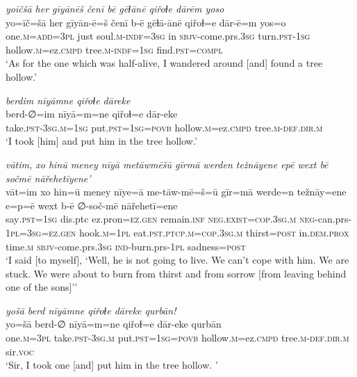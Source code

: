 \ea \label{ZQ.23}
\textit{yoīčšā her gīyānēš čenī bē gēɫānē qiřoɫe dārēm yoso} \\ 
\gll yo=īč=šā her gīyān-ē=š čenī b-ē gēɫā-ānē qiřoɫ=e dār-ē=m yos=o \\ 
 one\textsc{.m}\textsc{=add}\textsc{=3pl} just soul\textsc{.m}\textsc{-indf}\textsc{=3sg} in \textsc{sbjv-}come.prs\textsc{.3sg} turn\textsc{.pst}\textsc{-\textsc{1sg}} hollow\textsc{.m}=ez\textsc{.cmpd} tree\textsc{.m}\textsc{-indf}\textsc{=\textsc{1sg}} find\textsc{.pst}\textsc{=compl} \\ 
\glt `As for the one which was half-alive, I wandered around [and] found a tree hollow.'
\z 
 
\ea \label{ZQ.24}
\textit{berdim nīyāmne qiřoɫe dāreke} \\ 
\gll berd-∅=im nīyā=m=ne qiřoɫ=e dār-eke \\ 
 take\textsc{.pst}\textsc{-3sg}\textsc{.m}\textsc{=\textsc{1sg}} put\textsc{.pst}\textsc{=\textsc{1sg}}\textsc{=\textsc{povb}} hollow\textsc{.m}=ez\textsc{.cmpd} tree\textsc{.m}\textsc{-def}\textsc{.dir}\textsc{.m} \\ 
\glt `I took [him] and put him in the tree hollow.'
\z 
 
\ea \label{ZQ.25}
\textit{vātim, xo hinū meney nīyā metāwmēšū gīrmā werden težnāyene epē wext bē sočmē nāřehetīyene’} \\ 
\gll vāt=im xo hin=ū meney nīye=ā me-tāw-mē=š=ū gīr=mā werde=n težnāy=ene e=p=ē wext b-ē ∅-soč-mē nāřehetī=ene \\ 
 say\textsc{.pst}\textsc{=\textsc{1sg}} dis.ptc ez.pron\textsc{=ez.gen} remain\textsc{.inf} \textsc{\textsc{neg.}exist}\textsc{=cop}\textsc{.3sg}\textsc{.m} \textsc{neg-}can.prs\textsc{-\textsc{1pl}}\textsc{=3sg}\textsc{=ez.gen} hook\textsc{.m}\textsc{=\textsc{1pl}} eat\textsc{.pst}\textsc{.ptcp}\textsc{.m}\textsc{=cop}\textsc{.3sg}\textsc{.m} thirst\textsc{=\textsc{post}} in.\textsc{dem.prox} time\textsc{.m} \textsc{sbjv-}come.prs\textsc{.3sg} \textsc{ind-}burn.prs\textsc{-\textsc{1pl}} sadness\textsc{=\textsc{post}} \\ 
\glt `I said [to myself], ‘Well, he is not going to live. We can’t cope with him. We are stuck. We were about to burn from thirst and from sorrow [from leaving behind one of the sons]’'
\z 
 
\ea \label{ZQ.26}
\textit{yošā berd nīyāmne qiřoɫe dāreke qurbān!} \\ 
\gll yo=šā berd-∅ nīyā=m=ne qiřoɫ=e dār-eke qurbān \\ 
 one\textsc{.m}\textsc{=3pl} take\textsc{.pst}\textsc{-3sg}\textsc{.m} put\textsc{.pst}\textsc{=\textsc{1sg}}\textsc{=\textsc{povb}} hollow\textsc{.m}=ez\textsc{.cmpd} tree\textsc{.m}\textsc{-def}\textsc{.dir}\textsc{.m} sir.\textsc{voc} \\ 
\glt `Sir, I took one [and] put him in the tree hollow. '
\z 
 
